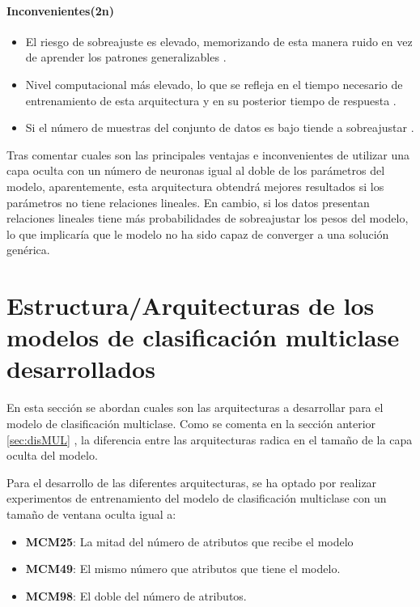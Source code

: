 \paragraph{Inconvenientes(2n)}
\begin{itemize}
	\item El riesgo de sobreajuste es elevado, memorizando de esta manera ruido en vez de aprender los patrones generalizables \cite{bishop2006pattern}.
	\item Nivel computacional más elevado, lo que se refleja en el tiempo necesario de entrenamiento de esta arquitectura y en su posterior tiempo de respuesta \cite{goodfellow2016deep}.
	\item Si el número de muestras del conjunto de datos es bajo tiende a sobreajustar \cite{overfitting2008}.
\end{itemize}

Tras comentar cuales son las principales ventajas e inconvenientes de utilizar una capa oculta con un número de neuronas igual al doble de los parámetros del modelo, aparentemente, esta arquitectura obtendrá mejores resultados si los parámetros no tiene relaciones lineales. En cambio, si los datos presentan relaciones lineales tiene más probabilidades de sobreajustar los pesos del modelo, lo que implicaría que le modelo no ha sido capaz de converger a una solución genérica.




\section{Estructura/Arquitecturas de los modelos de clasificación multiclase desarrollados}
En esta sección se abordan cuales son las arquitecturas a desarrollar para el modelo de clasificación multiclase. Como se comenta en la sección anterior \ref{sec:disMUL} , la diferencia entre las arquitecturas radica en el tamaño de la capa oculta del modelo.

Para el desarrollo de las diferentes arquitecturas, se ha optado por realizar experimentos de entrenamiento del modelo de clasificación multiclase con un tamaño de ventana oculta igual a:

\begin{itemize}

	\item \textbf{MCM25}: La mitad del número de atributos que recibe el modelo
	\item \textbf{MCM49}: El mismo número que atributos que tiene el modelo.
	\item \textbf{MCM98}: El doble del número de atributos. 

\end{itemize}

